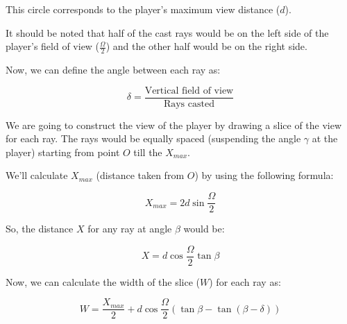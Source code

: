This circle corresponds to the player's maximum view distance ($d$).

It should be noted that half of the cast rays would be on the left side of the player's field of view ($\frac{\Omega}{2}$) and the other half would be on the right side.

Now, we can define the angle between each ray as:

\begin{equation}
    \delta = \frac{\text{Vertical field of view}}{\text{Rays casted}}
\end{equation}

We are going to construct the view of the player by drawing a slice of the view for each ray. The rays would be equally spaced (suspending the angle $\gamma$ at the player) starting from point $O$ till the $X_{max}$.

We'll calculate $X_{max}$ (distance taken from $O$) by using the following formula:

\begin{equation}
    X_{max} = 2 d \sin\frac{\Omega}{2}
\end{equation}

So, the distance $X$ for any ray at angle $\beta$ would be:

\begin{equation}
    X = d \cos\frac{\Omega}{2} \tan\beta
\end{equation}

Now, we can calculate the width of the slice ($W$) for each ray as:

\begin{equation}
    W = \frac{X_{max}}{2} + d \cos\frac{\Omega}{2} (\tan\beta - \tan(\beta - \delta))
\end{equation}

\newpage

